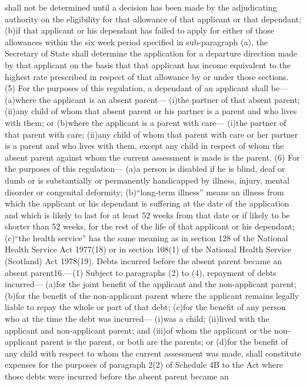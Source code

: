\documentclass[a4paper]{article}
\begin{document}
shall not be determined until a decision has been made by the adjudicating
authority on the eligibility for that allowance of that applicant or that
dependant;
(b)if that applicant or his dependant has failed to apply for either of those
allowances within the six week period specified in sub-paragraph (a), the
Secretary of State shall determine the application for a departure direction
made by that applicant on the basis that that applicant has income equivalent to
the highest rate prescribed in respect of that allowance by or under those
sections.
(5) For the purposes of this regulation, a dependant of an applicant shall be—
(a)where the applicant is an absent parent—
(i)the partner of that absent parent;
(ii)any child of whom that absent parent or his partner is a parent and who
lives with them; or
(b)where the applicant is a parent with care—
(i)the partner of that parent with care;
(ii)any child of whom that parent with care or her partner is a parent and who
lives with them, except any child in respect of whom the absent parent against
whom the current assessment is made is the parent.
(6) For the purposes of this regulation—
(a)a person is disabled if he is blind, deaf or dumb or is substantially or
permanently handicapped by illness, injury, mental disorder or congenital
deformity;
(b)“long-term illness” means an illness from which the applicant or his
dependant is suffering at the date of the application and which is likely to
last for at least 52 weeks from that date or if likely to be shorter than 52
weeks, for the rest of the life of that applicant or his dependant;
(c)“the health service” has the same meaning as in section 128 of the National
Health Service Act 1977(18) or in section 108(1) of the National Health Service
(Scotland) Act 1978(19).
Debts incurred before the absent parent became an absent parent16.—(1) Subject
to paragraphs (2) to (4), repayment of debts incurred—
(a)for the joint benefit of the applicant and the non-applicant parent;
(b)for the benefit of the non-applicant parent where the applicant remains
legally liable to repay the whole or part of that debt;
(c)for the benefit of any person who at the time the debt was incurred—
(i)was a child;
(ii)lived with the applicant and non-applicant parent; and
(iii)of whom the applicant or the non-applicant parent is the parent, or both
are the parents; or
(d)for the benefit of any child with respect to whom the current assessment was
made,
shall constitute expenses for the purposes of paragraph 2(2) of Schedule 4B to
the Act where those debts were incurred before the absent parent became an
\end{document}
